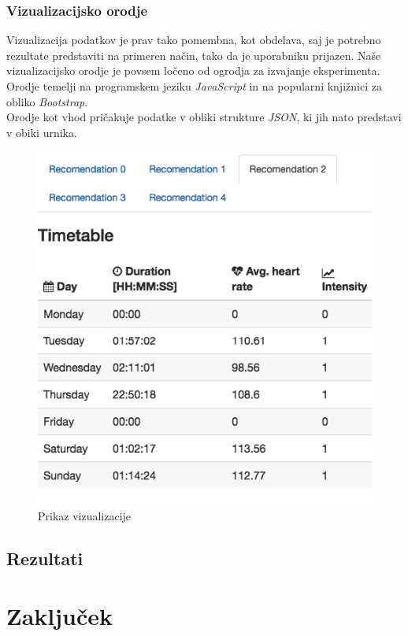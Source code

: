 \documentclass{acm_proc_article-sp}
\begin{document}
\subsubsection{Vizualizacijsko orodje}
Vizualizacija podatkov je prav tako pomembna, kot obdelava, saj je potrebno rezultate predstaviti na primeren način, tako da je uporabniku prijazen. Naše vizualizacijsko orodje je povsem ločeno od ogrodja za izvajanje eksperimenta. Orodje temelji na programskem jeziku \textit{JavaScript} in na popularni knjižnici za obliko \textit{Bootstrap}.\\
Orodje kot vhod pričakuje podatke v obliki strukture \textit{JSON}, ki jih nato predstavi v obiki urnika.\\ 


\begin{figure}
 \centering
 \includegraphics[width=\linewidth]{vizualization}
 \caption{Prikaz vizualizacije}
\end{figure}


\subsection{Rezultati}


\section{Zaključek}


%

%
%

\balancecolumns
\end{document}
